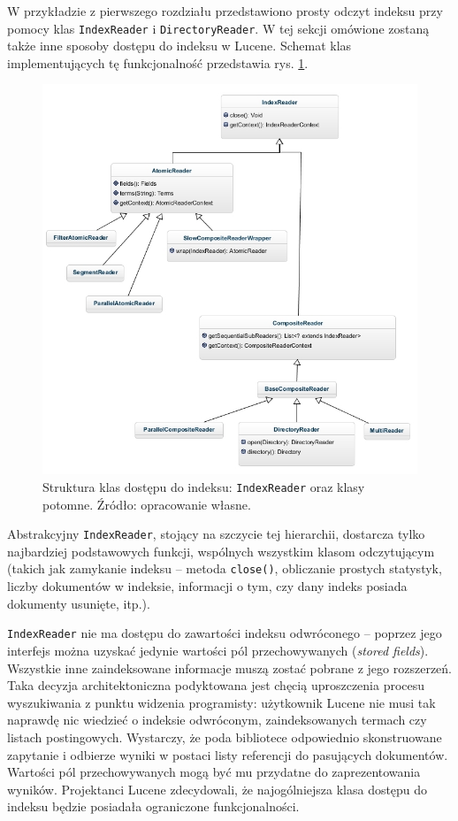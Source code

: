W przykładzie z pierwszego rozdziału przedstawiono prosty odczyt indeksu przy pomocy klas \texttt{IndexReader} i \texttt{DirectoryReader}. W tej sekcji omówione zostaną także inne sposoby dostępu do indeksu w Lucene. Schemat klas implementujących tę funkcjonalność przedstawia rys. \ref{fig:indexReader}. 

\begin{figure}[here]
 \centering
 \includegraphics[scale=0.54]{pictures/Readers_1.jpg}
 \caption{Struktura klas dostępu do indeksu: \texttt{IndexReader} oraz klasy potomne. Źródło: opracowanie własne. \label{fig:indexReader}}
\end{figure}

Abstrakcyjny \texttt{IndexReader}, stojący na szczycie tej hierarchii, dostarcza tylko najbardziej podstawowych funkcji, wspólnych wszystkim klasom odczytującym (takich jak zamykanie indeksu -- metoda \texttt{close()}, obliczanie prostych statystyk, liczby dokumentów w indeksie, informacji o tym, czy dany indeks posiada dokumenty usunięte, itp.). 

\texttt{IndexReader} nie ma dostępu do zawartości indeksu odwróconego -- poprzez jego interfejs można uzyskać jedynie wartości pól przechowywanych (\emph{stored fields}). Wszystkie inne zaindeksowane informacje muszą zostać pobrane z jego rozszerzeń. Taka decyzja architektoniczna podyktowana jest chęcią uproszczenia procesu wyszukiwania z punktu widzenia programisty: użytkownik Lucene nie musi tak naprawdę nic wiedzieć o indeksie odwróconym, zaindeksowanych termach czy listach postingowych. Wystarczy, że poda bibliotece odpowiednio skonstruowane zapytanie i odbierze wyniki w postaci listy referencji do pasujących dokumentów. Wartości pól przechowywanych mogą być mu przydatne do zaprezentowania wyników. Projektanci Lucene zdecydowali, że najogólniejsza klasa dostępu do indeksu będzie posiadała ograniczone funkcjonalności.

